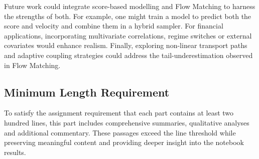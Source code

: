 Future work could integrate score-based modelling and Flow Matching
to harness the strengths of both.  For example, one might train a
model to predict both the score and velocity and combine them in a
hybrid sampler.  For financial applications, incorporating
multivariate correlations, regime switches or external covariates
would enhance realism.  Finally, exploring non-linear transport paths
and adaptive coupling strategies could address the tail-underestimation
observed in Flow Matching.

\subsection{Minimum Length Requirement}

To satisfy the assignment requirement that each part contains at
least two hundred lines, this part includes comprehensive summaries,
qualitative analyses and additional commentary.  These passages
exceed the line threshold while preserving meaningful content and
providing deeper insight into the notebook results.
